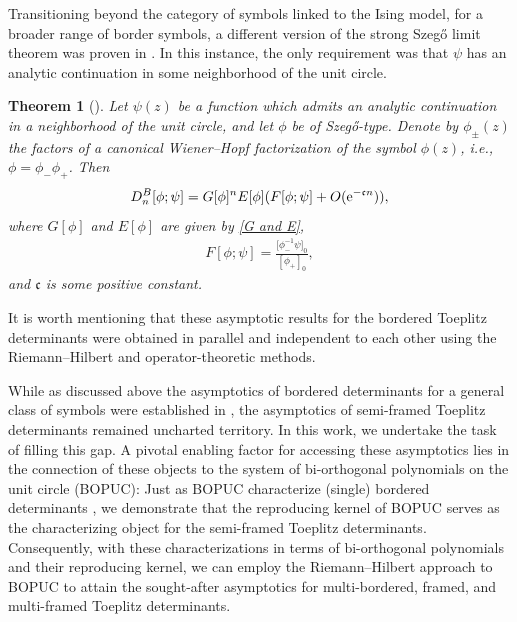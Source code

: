 \documentclass[10pt,a4paper]{amsart}
\numberwithin{equation}{section}
\newtheorem{Theorem}{Theorem}[section]
\newcommand{\T}{{\mathbb T}}
\begin{document}
	
	Transitioning beyond the category of symbols linked to the Ising model, for a broader range of border symbols, a different version of the strong Szeg\H{o} limit theorem was proven in \cite{BEGIL}. In this instance, the only requirement was that $\psi$ has an analytic continuation in some neighborhood of the unit circle.
	\begin{Theorem}[\cite{BEGIL}]\label{thm 1.2}
		Let $\psi(z)$ be a function which admits an analytic continuation in a neighborhood of the unit circle, and let
		$\phi$ be of Szeg\H{o}-type. Denote by $\phi_{\pm}(z)$ the factors of a canonical Wiener--Hopf factorization of the symbol
		$\phi(z)$, i.e., $\phi=\phi_-\phi_+$. Then
		\begin{gather*}%
			D^B_{n}[\phi ; \psi ] =
			G[\phi]^{n} E[\phi]( F[\phi;\psi] + O({\rm e}^{-\mathfrak{c}n})),
		\end{gather*}
		where $G[\phi]$ and $E[\phi]$ are given by \eqref{G and E},
		\begin{gather*}%
			F[\phi;\psi]=\frac{\big[\phi_-^{-1}\psi\big]_0}{[\phi_+]_0},
		\end{gather*}
		and $\mathfrak{c}$ is some positive constant.
	\end{Theorem}	
	It is worth mentioning that	these asymptotic results for the bordered Toeplitz determinants were obtained in parallel and independent to each other using the Riemann--Hilbert and operator-theoretic methods.
	
	
	
	While as discussed above the asymptotics of bordered determinants for a general class of symbols were established in \cite{BEGIL}, the asymptotics of semi-framed Toeplitz determinants remained uncharted territory. In this work, we undertake the task of filling this gap. A pivotal enabling factor for accessing these asymptotics lies in the connection of these objects to the system of bi-orthogonal polynomials on the unit circle (BOPUC): Just as BOPUC characterize (single) bordered determinants \cite{BEGIL}, we demonstrate that the reproducing kernel of BOPUC serves as the characterizing object for the semi-framed Toeplitz determinants. Consequently, with these characterizations in terms of bi-orthogonal polynomials and their reproducing kernel, we can employ the Riemann--Hilbert approach to BOPUC \cite{BDJ} to attain the sought-after asymptotics for multi-bordered, framed, and multi-framed Toeplitz determinants.
	
\end{document}
